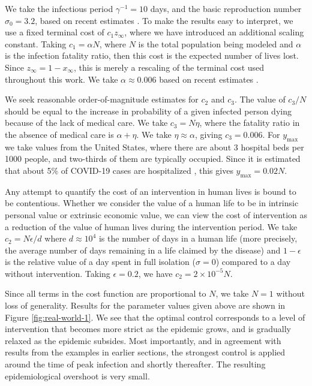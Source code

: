 \documentclass[english,12pt,letter]{article}
\newcommand{\Rnot}{\sigma_0}
\newcommand{\Sinf}{x_\infty}
\newcommand{\ymax}{y_\text{max}}
\begin{document}
We take the infectious period $\gamma^{-1}=10$ days, and the basic reproduction
number $\Rnot=3.2$, based on recent estimates \cite{verity2020estimates,liu2020reproductive}.
To make the results easy to interpret, we use a
fixed terminal cost of $c_1 z_\infty$, where we have introduced an additional
scaling constant.  Taking $c_1 = \alpha N$, where $N$ is the total population
being modeled and $\alpha$ is the infection fatality ratio, then this cost is
the expected number of lives lost.  Since $z_\infty=1-\Sinf$, this is merely a
rescaling of the terminal cost used throughout this work.  We take
$\alpha \approx 0.006$ based on recent estimates \cite{verity2020estimates,russell2020estimating,wu2020estimating}.

We seek reasonable order-of-magnitude estimates for $c_2$ and $c_3$.  
The value of $c_3/N$ should be equal to the increase in probability of a given
infected person dying because of the lack of medical care.  We take
$c_3 = N\eta$,
where the fatality ratio in the absence of medical care is $\alpha+\eta$.
We take $\eta\approx \alpha$, giving
$c_3 = 0.006$.  For $\ymax$ we take values from the United States, where
there are about 3 hospital beds per 1000 people, and two-thirds of them
are typically occupied.  Since it is estimated that about 5\% of COVID-19
cases are hospitalized \cite{verity2020estimates}, this gives $\ymax=0.02N$.

Any attempt to quantify the cost of an intervention in human lives is bound
to be contentious.  Whether we consider the value of a human life to be in
intrinsic personal value or extrinsic economic value, we can view the cost
of intervention as a reduction of the value of human lives during the intervention
period.  We take $c_2 = N\epsilon/d$ where $d\approx 10^4$ is the number
of days in a human life (more precisely, the average number of days remaining
in a life claimed by the disease) and $1-\epsilon$ is the relative value of a
day spent in full isolation ($\sigma=0$) compared to a day without intervention.
Taking $\epsilon=0.2$, we have $c_2 = 2\times10^{-5} N$.

Since all terms in the cost function are proportional to $N$, we take $N=1$ without
loss of generality.  Results for the parameter values given above are shown in Figure
\ref{fig:real-world-1}.  We see that the optimal control corresponds to a level
of intervention that becomes more strict as the epidemic grows, and is gradually
relaxed as the epidemic subsides.  Most importantly, and in agreement with results
from the examples in earlier sections, the strongest control is applied around
the time of peak infection and shortly thereafter.
The resulting epidemiological overshoot is very small.
\end{document}
